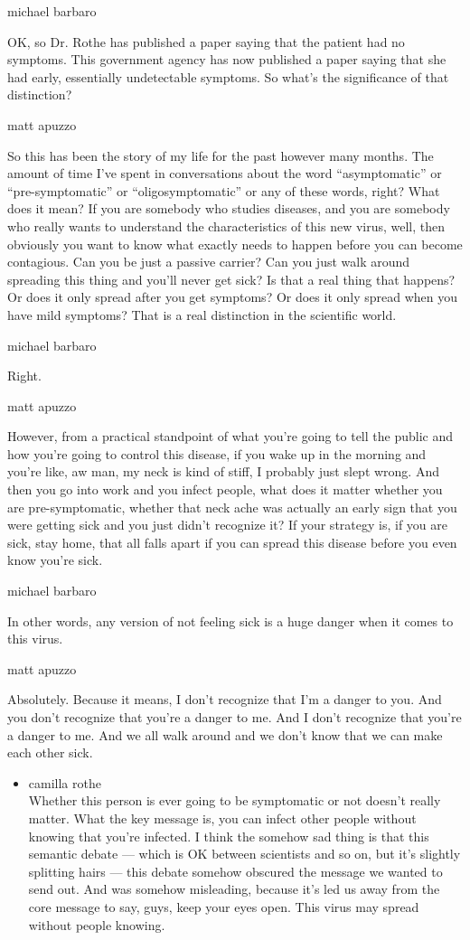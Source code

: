 michael barbaro

OK, so Dr. Rothe has published a paper saying that the patient had no
symptoms. This government agency has now published a paper saying that
she had early, essentially undetectable symptoms. So what's the
significance of that distinction?

matt apuzzo

So this has been the story of my life for the past however many months.
The amount of time I've spent in conversations about the word
``asymptomatic'' or ``pre-symptomatic'' or ``oligosymptomatic'' or any
of these words, right? What does it mean? If you are somebody who
studies diseases, and you are somebody who really wants to understand
the characteristics of this new virus, well, then obviously you want to
know what exactly needs to happen before you can become contagious. Can
you be just a passive carrier? Can you just walk around spreading this
thing and you'll never get sick? Is that a real thing that happens? Or
does it only spread after you get symptoms? Or does it only spread when
you have mild symptoms? That is a real distinction in the scientific
world.

michael barbaro

Right.

matt apuzzo

However, from a practical standpoint of what you're going to tell the
public and how you're going to control this disease, if you wake up in
the morning and you're like, aw man, my neck is kind of stiff, I
probably just slept wrong. And then you go into work and you infect
people, what does it matter whether you are pre-symptomatic, whether
that neck ache was actually an early sign that you were getting sick and
you just didn't recognize it? If your strategy is, if you are sick, stay
home, that all falls apart if you can spread this disease before you
even know you're sick.

michael barbaro

In other words, any version of not feeling sick is a huge danger when it
comes to this virus.

matt apuzzo

Absolutely. Because it means, I don't recognize that I'm a danger to
you. And you don't recognize that you're a danger to me. And I don't
recognize that you're a danger to me. And we all walk around and we
don't know that we can make each other sick.

\begin{itemize}
\tightlist
\item
  camilla rothe\\
  Whether this person is ever going to be symptomatic or not doesn't
  really matter. What the key message is, you can infect other people
  without knowing that you're infected. I think the somehow sad thing is
  that this semantic debate --- which is OK between scientists and so
  on, but it's slightly splitting hairs --- this debate somehow obscured
  the message we wanted to send out. And was somehow misleading, because
  it's led us away from the core message to say, guys, keep your eyes
  open. This virus may spread without people knowing.
\end{itemize}

